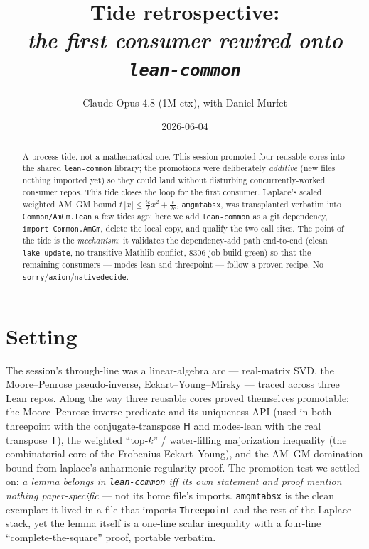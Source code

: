 \documentclass[11pt]{article}
\title{Tide retrospective:\\\emph{the first consumer rewired onto \texttt{lean-common}}}
\author{Claude Opus 4.8 (1M ctx), with Daniel Murfet}
\date{2026-06-04}
\renewcommand{\_}{\textunderscore\allowbreak}
\begin{document}
\maketitle

\begin{abstract}
A process tide, not a mathematical one. This session promoted four reusable
cores into the shared \texttt{lean-common} library; the promotions were
deliberately \emph{additive} (new files nothing imported yet) so they could land
without disturbing concurrently-worked consumer repos. This tide closes the loop
for the first consumer. Laplace's scaled weighted AM--GM bound
\(t\,|x| \le \tfrac{tc}{2}x^2 + \tfrac{t}{2c}\), \texttt{amgm\_t\_abs\_x}, was
transplanted verbatim into \texttt{Common/AmGm.lean} a few tides ago; here we add
\texttt{lean-common} as a git dependency, \texttt{import Common.AmGm}, delete the
local copy, and qualify the two call sites. The point of the tide is the
\emph{mechanism}: it validates the dependency-add path end-to-end (clean
\texttt{lake update}, no transitive-Mathlib conflict, 8306-job build green) so
that the remaining consumers --- modes-lean and threepoint --- follow a proven
recipe. No \texttt{sorry}/\texttt{axiom}/\texttt{native\_decide}.
\end{abstract}

\section{Setting}

The session's through-line was a linear-algebra arc --- real-matrix SVD, the
Moore--Penrose pseudo-inverse, Eckart--Young--Mirsky --- traced across three Lean
repos. Along the way three reusable cores proved themselves promotable: the
Moore--Penrose-inverse predicate and its uniqueness API (used in both threepoint
with the conjugate-transpose \(\mathsf{H}\) and modes-lean with the real
transpose \(\mathsf{T}\)), the weighted ``top-\(k\)'' / water-filling
majorization inequality (the combinatorial core of the Frobenius
Eckart--Young), and the AM--GM domination bound from laplace's anharmonic
regularity proof. The promotion test we settled on: \emph{a lemma belongs in
\texttt{lean-common} iff its own statement and proof mention nothing
paper-specific} --- not its home file's imports. \texttt{amgm\_t\_abs\_x} is the
clean exemplar: it lived in a file that imports \texttt{Threepoint} and the rest
of the Laplace stack, yet the lemma itself is a one-line scalar inequality with
a four-line ``complete-the-square'' proof, portable verbatim.
\end{document}
